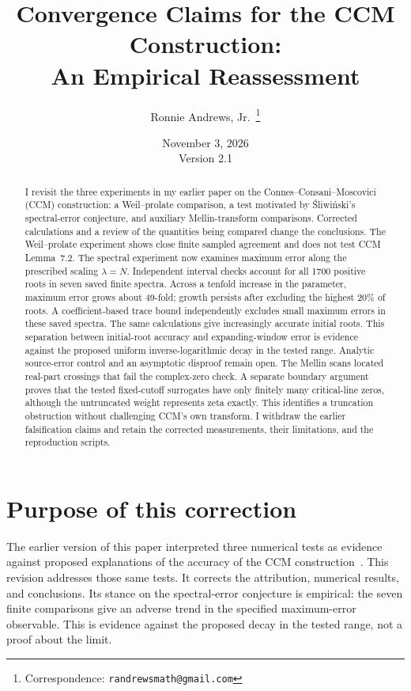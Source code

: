 \documentclass[11pt,a4paper]{article}
\title{Convergence Claims for the CCM Construction:\\An Empirical Reassessment}
\author{Ronnie Andrews, Jr.\,\orcidlink{0009-0003-9724-3104}%
\thanks{Correspondence: \texttt{randrewsmath@gmail.com}}}
\date{November 3, 2026\\[3pt]\small Version 2.1}
\begin{document}
\maketitle

\begin{abstract}
I revisit the three experiments in my earlier paper on the
Connes--Consani--Moscovici (CCM) construction: a Weil--prolate comparison,
a test motivated by \'Sliwi\'nski's spectral-error conjecture, and
auxiliary Mellin-transform comparisons. Corrected calculations and a
review of the quantities being compared change the conclusions.
The Weil--prolate experiment shows close finite sampled agreement and
does not test CCM Lemma~7.2. The spectral experiment now examines
maximum error along the prescribed scaling $\lambda=N$. Independent
interval checks account for all 1700 positive roots in seven saved
finite spectra. Across a tenfold increase in the parameter, maximum
error grows about 49-fold; growth persists after excluding the highest
20\% of roots. A coefficient-based trace bound independently excludes
small maximum errors in these saved spectra. The same calculations give increasingly accurate initial
roots. This separation between initial-root accuracy and expanding-window
error is evidence against the proposed uniform inverse-logarithmic decay
in the tested range. Analytic source-error control and an asymptotic
disproof remain open. The Mellin scans located real-part crossings
that fail the complex-zero check. A separate boundary argument proves
that the tested fixed-cutoff surrogates have only finitely many
critical-line zeros, although the untruncated weight represents zeta
exactly. This identifies a truncation obstruction without challenging
CCM's own transform. I withdraw the earlier falsification claims and
retain the corrected measurements, their limitations, and the
reproduction scripts.
\end{abstract}

\section{Purpose of this correction}

The earlier version of this paper interpreted three numerical tests
as evidence against proposed explanations of the accuracy of the CCM
construction~\cite{CCM2025}. This revision addresses those same tests.
It corrects the attribution, numerical results, and conclusions.
Its stance on the spectral-error conjecture is empirical: the seven
finite comparisons give an adverse trend in the specified maximum-error
observable. This is evidence against the proposed decay in the tested
range, not a proof about the limit.
\end{document}
